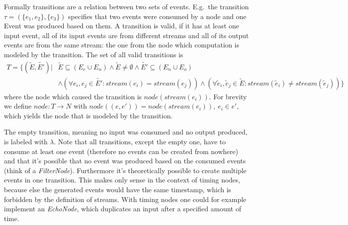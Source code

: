 Formally transitions are a relation between two sets of events.
E.g.\ the transition \(\tau = (\{e_1,e_2\}, \{e_3\})\) specifies that two events were consumed by a node and one Event was produced based on them.
A transition is valid, if it has at least one input event, all of its input events are from different streams and all of its output events are from the same stream: the one from the node which computation is modeled by the transition.
The set of all valid transitions is
\begin{align*}
  T = \{(\widetilde{E}, \widetilde{E'}) | &\widetilde{E} \subseteq (E_e \cup E_n) \land \widetilde{E} \neq \emptyset \land \widetilde{E'} \subseteq (E_n \cup E_o)\\
&\land (\forall e_i, e_j \in \widetilde{E'}: \mathit{stream}(e_i) = \mathit{stream}(e_j)) \land (\forall \widetilde{e}_i, \widetilde{e}_j \in \widetilde{E}: \mathit{stream}(\widetilde{e}_i) \neq \mathit{stream}(\widetilde{e}_j))\}
\end{align*}
where the node which caused the transition is \(\mathit{node}(\mathit{stream}(e_i))\).
For brevity we define \(\mathit{node} : T \rightarrow N\) with \(\mathit{node}((e, e')) = \mathit{node}(\mathit{stream}(e_i)),\ e_i \in e'\), which yields the node that is modeled by the transition.

The empty transition, meaning no input was consumed and no output produced, is labeled with \(\lambda\).
Note that all transitions, except the empty one, have to consume at least one event (therefore no events can be created from nowhere) and that it's possible that no event was produced based on the consumed events (think of a \emph{FilterNode}).
Furthermore it's theoretically possible to create multiple events in one transition.
This makes only sense in the context of timing nodes, because else the generated events would have the same timestamp, which is forbidden by the definition of streams.
With timing nodes one could for example implement an \emph{EchoNode}, which duplicates an input after a specified amount of time.

